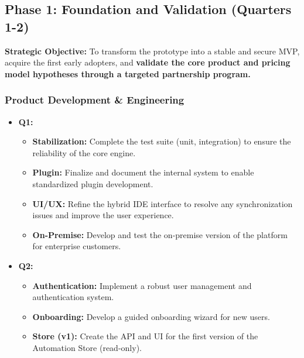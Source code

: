 
\subsection{Phase 1: Foundation and Validation (Quarters 1-2)}
\textbf{Strategic Objective:} To transform the prototype into a stable and secure MVP, acquire the first early adopters, and \textbf{validate the core product and pricing model hypotheses through a targeted partnership program.}

\subsubsection{Product Development \& Engineering}
\begin{itemize}[leftmargin=*]
    \item \textbf{Q1:}
    \begin{itemize}
        \item \textbf{Stabilization:} Complete the test suite (unit, integration) to ensure the reliability of the core engine.
        \item \textbf{Plugin:} Finalize and document the internal system to enable standardized plugin development.
        \item \textbf{UI/UX:} Refine the hybrid IDE interface to resolve any synchronization issues and improve the user experience.
        \item \textbf{On-Premise:} Develop and test the on-premise version of the platform for enterprise customers.
    \end{itemize}
    \item \textbf{Q2:}
    \begin{itemize}
        \item \textbf{Authentication:} Implement a robust user management and authentication system.
        \item \textbf{Onboarding:} Develop a guided onboarding wizard for new users.
        \item \textbf{Store (v1):} Create the API and UI for the first version of the Automation Store (read-only).
    \end{itemize}
\end{itemize}

